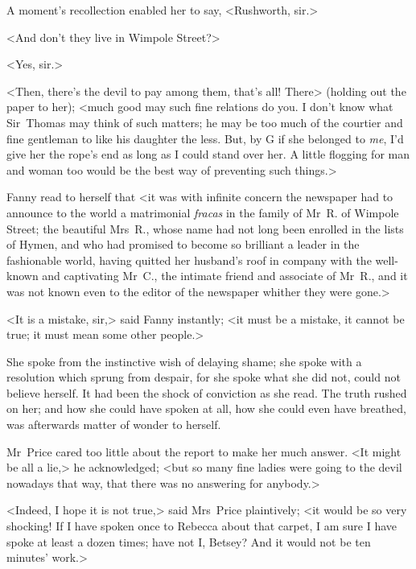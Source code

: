 A moment's recollection enabled her to say, <Rushworth, sir.>

<And don't they live in Wimpole Street?>

<Yes, sir.>

<Then, there's the devil to pay among them, that's all! There> (holding out the paper to her); <much good may such fine relations do you. I don't know what Sir~Thomas may think of such matters; he may be too much of the courtier and fine gentleman to like his daughter the less. But, by G\emdashpunct{!} if she belonged to \textit{me}, I'd give her the rope's end as long as I could stand over her. A little flogging for man and woman too would be the best way of preventing such things.>

Fanny read to herself that <it was with infinite concern the newspaper had to announce to the world a matrimonial \textit{fracas}  in the family of Mr~R. of Wimpole Street; the beautiful Mrs~R., whose name had not long been enrolled in the lists of Hymen, and who had promised to become so brilliant a leader in the fashionable world, having quitted her husband's roof in company with the well-known and captivating Mr~C., the intimate friend and associate of Mr~R., and it was not known even to the editor of the newspaper whither they were gone.>

<It is a mistake, sir,> said Fanny instantly; <it must be a mistake, it cannot be true; it must mean some other people.>

She spoke from the instinctive wish of delaying shame; she spoke with a resolution which sprung from despair, for she spoke what she did not, could not believe herself. It had been the shock of conviction as she read. The truth rushed on her; and how she could have spoken at all, how she could even have breathed, was afterwards matter of wonder to herself.

Mr~Price cared too little about the report to make her much answer. <It might be all a lie,> he acknowledged; <but so many fine ladies were going to the devil nowadays that way, that there was no answering for anybody.>

<Indeed, I hope it is not true,> said Mrs~Price plaintively; <it would be so very shocking! If I have spoken once to Rebecca about that carpet, I am sure I have spoke at least a dozen times; have not I, Betsey? And it would not be ten minutes' work.>

